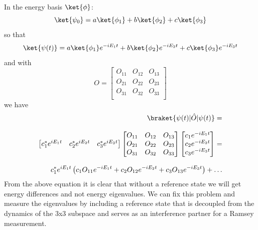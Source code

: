 {In the energy basis $\ket{\phi}$:
\begin{equation*}
    \ket{\psi_0} = a\ket{\phi_1} + b\ket{\phi_2} + c\ket{\phi_3}
\end{equation*}
so that
\begin{equation*}
    \ket{\psi (t)} = a\ket{\phi_1}e^{-i E_1 t} + b\ket{\phi_2}e^{-i E_2 t} + c\ket{\phi_3}e^{-i E_3 t}
\end{equation*}
and with
\begin{equation*}
    O =
    \begin{bmatrix}
        O_{11} & O_{12} & O_{13}\\
        O_{21} & O_{22} & O_{23}\\
        O_{31} & O_{32} & O_{33}\\
    \end{bmatrix}
\end{equation*}
we have
\begin{equation*}
    \begin{aligned}
        \braket{\psi(t)|\hat{O}|\psi(t)} = \\[2.0ex]
        \begin{bmatrix}
            c_1^* e^{i E_1 t} & c_2^* e^{i E_2 t} & c_3^* e^{i E_3 t}
        \end{bmatrix}
        \begin{bmatrix}
            O_{11} & O_{12} & O_{13}\\
            O_{21} & O_{22} & O_{23}\\
            O_{31} & O_{32} & O_{33}\\
        \end{bmatrix}
        \begin{bmatrix}
            c_1 e^{-i E_1 t} \\
            c_2 e^{-i E_2 t} \\
            c_3 e^{-i E_3 t}
        \end{bmatrix} = \\[2.0 ex]
        c_1^* e^{i E_1 t} \left( c_1 O_{11} e^{-i E_1 t} + c_2 O_{12} e^{-i E_2 t} + c_3 O_{13} e^{-i E_3 t} \right) + \mathellipsis
    \end{aligned}
\end{equation*}
From the above equation it is clear that without a reference state we will get energy differences and not energy eigenvalues.
We can fix this problem and measure the eigenvalues by including a reference state that is decoupled from the dynamics of the 3x3 subspace and serves as an interference partner for a Ramsey measurement.
}
